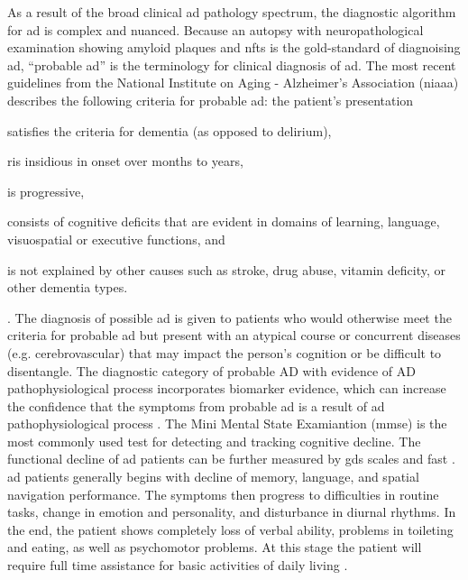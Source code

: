 As a result of the broad clinical \gls{ad} pathology spectrum, the diagnostic algorithm for \gls{ad} is complex and nuanced. Because an autopsy with neuropathological examination showing amyloid plaques and \gls{nft}s is the gold-standard of diagnoising \gls{ad}, ``probable \gls{ad}'' is the terminology for clinical diagnosis of \gls{ad}\citep{hyman12}. The most recent guidelines from the National Institute on Aging - Alzheimer's Association (\gls{niaaa}) describes the following criteria for probable \gls{ad}: the patient's presentation 
\begin{enumerate*}[label={\alph*)}, font={\bfseries}]
    \item satisfies the criteria for dementia (as opposed to delirium), 
    \item ris insidious in onset over months to years, 
    \item is progressive,
    \item consists of cognitive deficits that are evident in domains of learning, language, visuospatial or executive functions, and 
    \item is not explained by other causes such as stroke, drug abuse, vitamin deficity, or other dementia types.
\end{enumerate*} \citep{mckhann11}.
The diagnosis of possible \gls{ad} is given to patients who would otherwise meet the criteria for probable \gls{ad} but present with an atypical course or concurrent diseases (e.g. cerebrovascular) that may impact the person's cognition or be difficult to disentangle. The diagnostic category of probable AD with evidence of AD pathophysiological process incorporates biomarker evidence, which can increase the confidence that the symptoms from probable \gls{ad} is a result of \gls{ad} pathophysiological process \citep{mckhann11}. 
The Mini Mental State Examiantion (\gls{mmse}) is the most commonly used test for detecting and tracking cognitive decline. The functional decline of \gls{ad} patients can be further measured by \gls{gds} scales \citep{reisberg82} and \gls{fast} \citep{sclan92}. \gls{ad} patients generally begins with decline of memory, language, and spatial navigation performance. The symptoms then progress to difficulties in routine tasks, change in emotion and personality, and disturbance in diurnal rhythms. In the end, the patient shows completely loss of verbal ability, problems in toileting and eating, as well as psychomotor problems. At this stage the patient will require full time assistance for basic activities of daily living \citep{reisberg82, sclan92}.

